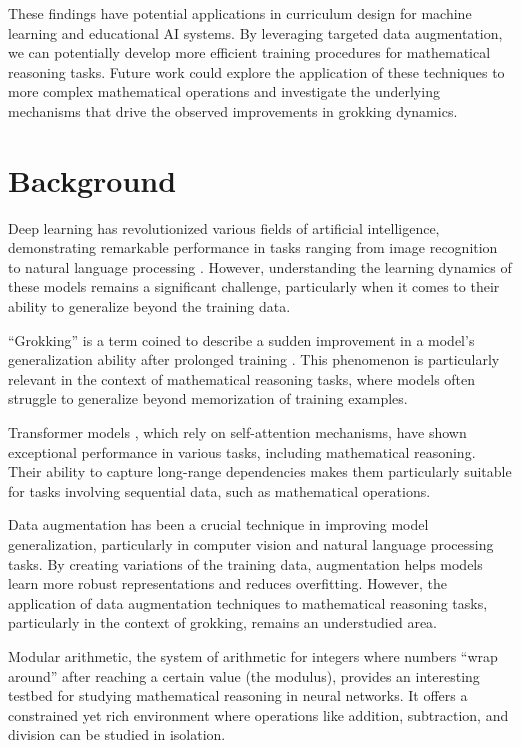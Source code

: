 \documentclass{article} %
\begin{document}
These findings have potential applications in curriculum design for machine learning and educational AI systems. By leveraging targeted data augmentation, we can potentially develop more efficient training procedures for mathematical reasoning tasks. Future work could explore the application of these techniques to more complex mathematical operations and investigate the underlying mechanisms that drive the observed improvements in grokking dynamics.


\section{Background}
\label{sec:background}

Deep learning has revolutionized various fields of artificial intelligence, demonstrating remarkable performance in tasks ranging from image recognition to natural language processing \cite{goodfellow2016deep}. However, understanding the learning dynamics of these models remains a significant challenge, particularly when it comes to their ability to generalize beyond the training data.

``Grokking'' is a term coined to describe a sudden improvement in a model's generalization ability after prolonged training \cite{power2022grokking}. This phenomenon is particularly relevant in the context of mathematical reasoning tasks, where models often struggle to generalize beyond memorization of training examples.

Transformer models \cite{vaswani2017attention}, which rely on self-attention mechanisms, have shown exceptional performance in various tasks, including mathematical reasoning. Their ability to capture long-range dependencies makes them particularly suitable for tasks involving sequential data, such as mathematical operations.

Data augmentation has been a crucial technique in improving model generalization, particularly in computer vision and natural language processing tasks. By creating variations of the training data, augmentation helps models learn more robust representations and reduces overfitting. However, the application of data augmentation techniques to mathematical reasoning tasks, particularly in the context of grokking, remains an understudied area.

Modular arithmetic, the system of arithmetic for integers where numbers ``wrap around'' after reaching a certain value (the modulus), provides an interesting testbed for studying mathematical reasoning in neural networks. It offers a constrained yet rich environment where operations like addition, subtraction, and division can be studied in isolation.
\end{document}

